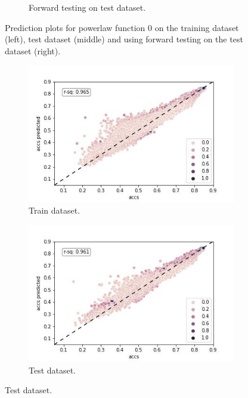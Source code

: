 \documentclass{article} %
\begin{document}
\begin{figure}
\begin{subfigure}{.33\textwidth}
        \caption{Forward testing on test dataset.}
        \label{fig:powerlaw_acc_classes_linear_epoch_linear_forward_val}
    \end{subfigure}
    \caption{Prediction plots for powerlaw function 0 on the training dataset (left), test dataset (middle) and using forward testing on the test dataset (right).}
    \label{fig:powerlaw_prediction_plot_fct_0}
\end{figure}



\begin{figure}
    \begin{subfigure}{.33\textwidth}
        \centering
        \includegraphics[width=.8\linewidth]{cifar10/powerlaw_all_epochs_accs_hat_classes_arctan_epoch_artan.jpg}
        \caption{Train dataset.}
        \label{fig:powerlaw_acc_classes_arctan_epoch_artan_train}
    \end{subfigure}%
    \begin{subfigure}{.33\textwidth}
        \centering
        \includegraphics[width=.8\linewidth]{cifar10/powerlaw_all_epochs_accs_hat_classes_arctan_epoch_artan_val.jpg}
        \caption{Test dataset.}
        \label{fig:powerlaw_acc_classes_arctan_epoch_artan_val}

\end{subfigure}
\end{figure}
\end{document}
